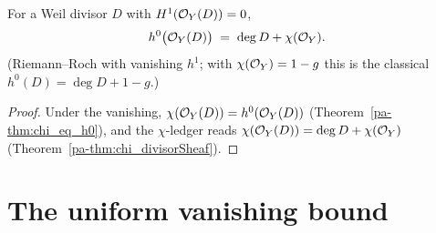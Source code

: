 \begin{theorem}
  \label{pa-thm:h0_eq_deg_add_chi}
  \leanok

  For a Weil divisor \(D\) with \(H^1(\mathcal{O}_{Y}(D)) = 0\),
  \[
    h^0\bigl(\mathcal{O}_{Y}(D)\bigr) \;=\; \deg D + \chi(\mathcal{O}_{Y}) .
  \]
  (Riemann--Roch with vanishing \(h^1\); with \(\chi(\mathcal{O}_{Y}) = 1 - g\) this is the
  classical \(h^0(D) = \deg D + 1 - g\).)
\end{theorem}
\begin{proof}
  \leanok
  Under the vanishing, \(\chi(\mathcal{O}_{Y}(D)) = h^0(\mathcal{O}_{Y}(D))\)
  (Theorem~\ref{pa-thm:chi_eq_h0}), and the \(\chi\)-ledger reads
  \(\chi(\mathcal{O}_{Y}(D)) = \deg D + \chi(\mathcal{O}_{Y})\)
  (Theorem~\ref{pa-thm:chi_divisorSheaf}).
\end{proof}

\section{The uniform vanishing bound}
\label{pa-sec:uniformVanishing}

